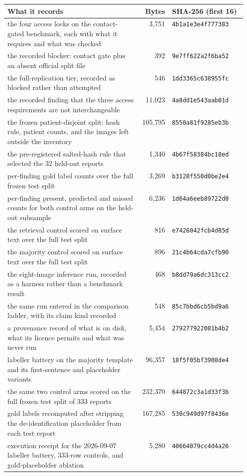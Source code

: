 \begingroup
\setlength{\tabcolsep}{5pt}
\begin{tabular}{@{}p{0.56\linewidth}rl@{}}
\toprule
What it records & Bytes & SHA-256 (first 16) \\
\midrule
the four access locks on the contact-gated benchmark, each with what it requires and what was checked &   3,751 & \texttt{4b1a1e3e4f777383} \\
the recorded blocker: contact gate plus an absent official split file &     392 & \texttt{9e7ff622a2f6ba52} \\
the full-replication tier, recorded as blocked rather than attempted &     546 & \texttt{1dd3365c638955fc} \\
the recorded finding that the three access requirements are not interchangeable &  11,023 & \texttt{4a8dd1e543aab01d} \\
the frozen patient-disjoint split: hash rule, patient counts, and the images left outside the inventory & 105,795 & \texttt{8550a81f9285eb3b} \\
the pre-registered salted-hash rule that selected the 32 held-out reports &   1,340 & \texttt{4b67f58384bc18ed} \\
per-finding gold label counts over the full frozen test split &   3,269 & \texttt{b3128f550d0be2e4} \\
per-finding present, predicted and missed counts for both control arms on the held-out subsample &   6,236 & \texttt{1d64a6eeb89722d0} \\
the retrieval control scored on surface text over the full test split &     816 & \texttt{e7426042fcb4d85d} \\
the majority control scored on surface text over the full test split &     896 & \texttt{21c4b64cda7cfb90} \\
the eight-image inference run, recorded as a harness rather than a benchmark result &     468 & \texttt{b8dd79a6dc313cc2} \\
the same run entered in the comparison ladder, with its claim kind recorded &     548 & \texttt{85c7bbd6cb5bd9a6} \\
a provenance record of what is on disk, what its licence permits and what was never run &   5,454 & \texttt{279277922081b4b2} \\
labeller battery on the majority template and its first-sentence and placeholder variants &  96,357 & \texttt{18f5f05bf3908de4} \\
the same two control arms scored on the full frozen test split of 333 reports & 232,370 & \texttt{644872c3a1d33f3b} \\
gold labels recomputed after stripping the de-identification placeholder from each test report & 167,285 & \texttt{530c949d97f8436e} \\
execution receipt for the 2026-09-07 labeller battery, 333-row controls, and gold-placeholder ablation &   5,280 & \texttt{40664079cc4d4a26} \\
\bottomrule
\end{tabular}
\endgroup
